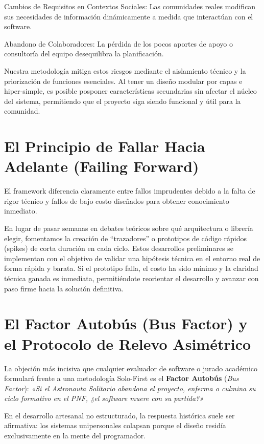\documentclass[14pt,a4paper,oneside]{extbook}
\begin{document}
Cambios de Requisitos en Contextos Sociales: Las comunidades reales modifican sus necesidades de información dinámicamente a medida que interactúan con el software.

Abandono de Colaboradores: La pérdida de los pocos aportes de apoyo o consultoría del equipo desequilibra la planificación.

Nuestra metodología mitiga estos riesgos mediante el aislamiento técnico y la priorización de funciones esenciales. Al tener un diseño modular por capas e hiper-simple, es posible posponer características secundarias sin afectar el núcleo del sistema, permitiendo que el proyecto siga siendo funcional y útil para la comunidad.

\section{El Principio de Fallar Hacia Adelante (Failing Forward)}

El framework diferencia claramente entre fallos imprudentes debido a la falta de rigor técnico y fallos de bajo costo diseñados para obtener conocimiento inmediato.

En lugar de pasar semanas en debates teóricos sobre qué arquitectura o librería elegir, fomentamos la creación de \enquote{trazadores} o prototipos de código rápidos (spikes) de corta duración en cada ciclo. Estos desarrollos preliminares se implementan con el objetivo de validar una hipótesis técnica en el entorno real de forma rápida y barata. Si el prototipo falla, el costo ha sido mínimo y la claridad técnica ganada es inmediata, permitiéndote reorientar el desarrollo y avanzar con paso firme hacia la solución definitiva.

\section{El Factor Autobús (Bus Factor) y el Protocolo de Relevo Asimétrico}

La objeción más incisiva que cualquier evaluador de software o jurado académico formulará frente a una metodología Solo-First es el \textbf{Factor Autobús} (\textit{Bus Factor}): \textit{«Si el Astronauta Solitario abandona el proyecto, enferma o culmina su ciclo formativo en el PNF, ¿el software muere con su partida?»}

En el desarrollo artesanal no estructurado, la respuesta histórica suele ser afirmativa: los sistemas unipersonales colapsan porque el diseño residía exclusivamente en la mente del programador. 
\end{document}
